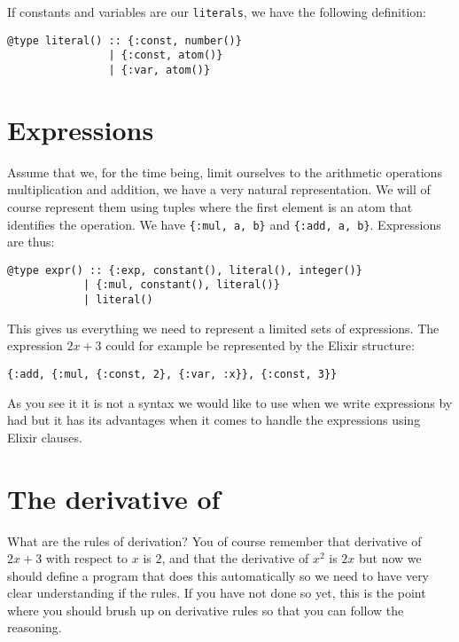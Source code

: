 \documentclass[a4paper,11pt]{article}
\begin{document}
If constants and variables are our {\tt literals}, we have the
following definition:

\begin{verbatim}
@type literal() :: {:const, number()} 
                | {:const, atom()} 
                | {:var, atom()}
\end{verbatim}



\section{Expressions}

Assume that we, for the time being, limit ourselves to the arithmetic
operations multiplication and addition, we have a very natural
representation. We will of course represent them using tuples where
the first element is an atom that identifies the operation. We have
{\tt\{:mul, a, b\}} and {\tt \{:add, a, b\}}. Expressions are thus:

\begin{verbatim}
@type expr() :: {:exp, constant(), literal(), integer()} 
            | {:mul, constant(), literal()} 
            | literal()
\end{verbatim}

This gives us everything we need to represent a limited sets of
expressions. The expression $2x + 3$ could for example be represented
by the Elixir structure:

\begin{verbatim}
{:add, {:mul, {:const, 2}, {:var, :x}}, {:const, 3}}
\end{verbatim}

As you see it it is not a syntax we would like to use when we write
expressions by had but it has its advantages when it comes to handle
the expressions using Elixir clauses. 



\section{The derivative of}

What are the rules of derivation? You of course remember that derivative
of $2x + 3$ with respect to $x$ is $2$, and that the derivative of
$x^2$ is $2x$ but now we should define a program that does this
automatically so we need to have very clear understanding if the
rules. If you have not done so yet, this is the point where you should
brush up on derivative rules so that you can follow the reasoning.
\end{document}
